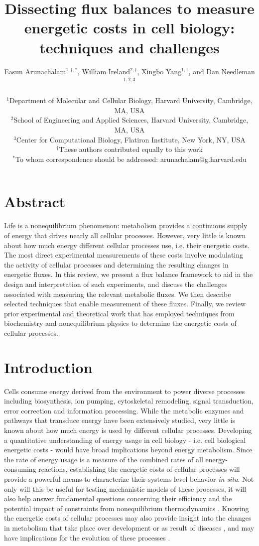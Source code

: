 \documentclass{compactarticle}
\title{Dissecting flux balances to measure energetic costs in cell biology: techniques and challenges}
\author
{
Easun Arunachalam$^{1,\dagger,\ast}$, William Ireland$^{2, \dagger}$, Xingbo Yang$^{1, \dagger}$, and Dan Needleman$^{1,2,3}$\\
\\
\normalsize{$^{1}$Department of Molecular and Cellular Biology, Harvard University, Cambridge, MA, USA}\\
\normalsize{$^{2}$School of Engineering and Applied Sciences, Harvard University, Cambridge, MA, USA}\\
\normalsize{$^{3}$Center for Computational Biology, Flatiron Institute, New York, NY, USA}\\
\normalsize{$^\dagger$These authors contributed equally to this work}\\
\normalsize{$^\ast$To whom correspondence should be addressed: arunachalam@g.harvard.edu}
}
\begin{document}
\maketitle

\section*{Abstract}
Life is a nonequilibrium phenomenon: metabolism provides a continuous supply of energy that drives nearly all cellular processes. However, very little is known about how much energy different cellular processes use, i.e. their energetic costs.  The most direct experimental measurements of these costs involve modulating the activity of cellular processes and determining the resulting changes in energetic fluxes. In this review, we present a flux balance framework to aid in the design and interpretation of such experiments, and discuss the challenges associated with measuring the relevant metabolic fluxes. We then describe selected techniques that enable measurement of these fluxes. Finally, we review prior experimental and theoretical work that has employed techniques from biochemistry and nonequilibrium physics to determine the energetic costs of cellular processes.

\tableofcontents

\section{Introduction}

Cells consume energy derived from the environment to power diverse processes including biosynthesis, ion pumping, cytoskeletal remodeling, signal transduction, error correction and information processing. While the metabolic enzymes and pathways that transduce energy have been extensively studied, very little is known about how much energy is used by different cellular processes. Developing a quantitative understanding of energy usage in cell biology - i.e. cell biological energetic costs - would have broad implications beyond energy metabolism. Since the rate of energy usage is a measure of the combined rates of all energy-consuming reactions, establishing the energetic costs of cellular processes will provide a powerful means to characterize their systems-level behavior \textit{in situ}. Not only will this be useful for testing mechanistic models of these processes, it will also help answer fundamental questions concerning their efficiency and the potential impact of constraints from nonequilibrium thermodynamics \cite{yang2021physical}. Knowing the energetic costs of cellular processes may also provide insight into the changes in metabolism that take place over development or as result of diseases \cite{yang2021physical}, and may have implications for the evolution of these processes \cite{lynch2015bioenergetic}. 
\end{document}

